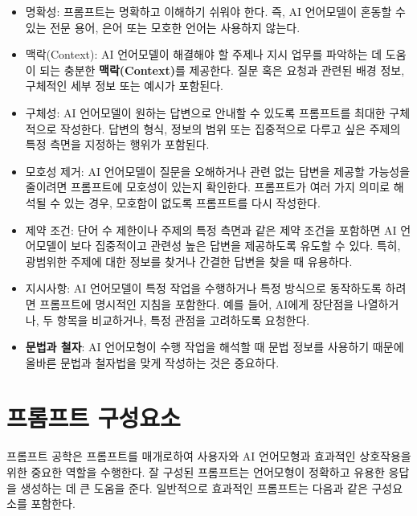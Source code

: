 \documentclass[
  letterpaper,
]{book}
\begin{document}
\begin{itemize}
\item
  명확성: 프롬프트는 명확하고 이해하기 쉬워야 한다. 즉, AI 언어모델이
  혼동할 수 있는 전문 용어, 은어 또는 모호한 언어는 사용하지 않는다.
\item
  맥락(Context): AI 언어모델이 해결해야 할 주제나 지시 업무를 파악하는
  데 도움이 되는 충분한 \textbf{맥락(Context)}를 제공한다. 질문 혹은
  요청과 관련된 배경 정보, 구체적인 세부 정보 또는 예시가 포함된다.
\item
  구체성: AI 언어모델이 원하는 답변으로 안내할 수 있도록 프롬프트를
  최대한 구체적으로 작성한다. 답변의 형식, 정보의 범위 또는 집중적으로
  다루고 싶은 주제의 특정 측면을 지정하는 행위가 포함된다.
\item
  모호성 제거: AI 언어모델이 질문을 오해하거나 관련 없는 답변을 제공할
  가능성을 줄이려면 프롬프트에 모호성이 있는지 확인한다. 프롬프트가 여러
  가지 의미로 해석될 수 있는 경우, 모호함이 없도록 프롬프트를 다시
  작성한다.
\item
  제약 조건: 단어 수 제한이나 주제의 특정 측면과 같은 제약 조건을
  포함하면 AI 언어모델이 보다 집중적이고 관련성 높은 답변을 제공하도록
  유도할 수 있다. 특히, 광범위한 주제에 대한 정보를 찾거나 간결한 답변을
  찾을 때 유용하다.
\item
  지시사항: AI 언어모델이 특정 작업을 수행하거나 특정 방식으로
  동작하도록 하려면 프롬프트에 명시적인 지침을 포함한다. 예를 들어,
  AI에게 장단점을 나열하거나, 두 항목을 비교하거나, 특정 관점을
  고려하도록 요청한다.
\item
  \textbf{문법과 철자}: AI 언어모형이 수행 작업을 해석할 때 문법 정보를
  사용하기 때문에 올바른 문법과 철자법을 맞게 작성하는 것은 중요하다.
\end{itemize}

\hypertarget{uxd504uxb86cuxd504uxd2b8-uxad6cuxc131uxc694uxc18c}{%
\section{프롬프트
구성요소}\label{uxd504uxb86cuxd504uxd2b8-uxad6cuxc131uxc694uxc18c}}

프롬프트 공학은 프롬프트를 매개로하여 사용자와 AI 언어모형과 효과적인
상호작용을 위한 중요한 역할을 수행한다. 잘 구성된 프롬프트는 언어모형이
정확하고 유용한 응답을 생성하는 데 큰 도움을 준다. 일반적으로 효과적인
프롬프트는 다음과 같은 구성요소를 포함한다.
\end{document}
